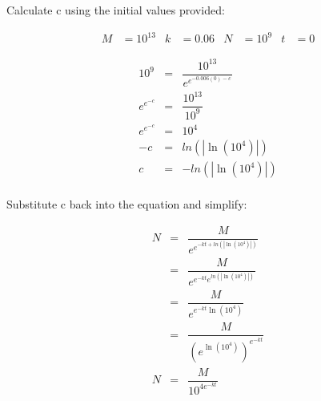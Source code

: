 \clearpage

Calculate c using the initial values provided:

\begin{align*}
    M &= 10^{13} & k &= 0.06 & N &= 10^9 & t &= 0
\end{align*}

\begin{eqnarray*}
10^9        &=& \dfrac{10^{13}}{e^{e^{-0.006(0) - c}}} \\
e^{e^{-c}}  &=& \dfrac{10^{13}}{10^9} \\
e^{e^{-c}}  &=& {10^4} \\
-c          &=& ln\left(\left|\ln\left({10^4}\right)\right|\right) \\
c           &=& -ln\left(\left|\ln\left({10^4}\right)\right|\right) \\
\end{eqnarray*}

Substitute c back into the equation and simplify:

\begin{eqnarray*}
N &=& \dfrac{M}{e^{e^{-kt + ln\left(\left|\ln\left({10^4}\right)\right|\right)}}} \\
  &=& \dfrac{M}{e^{e^{-kt} e^{ln\left(\left|\ln\left({10^4}\right)\right|\right)}}} \\
  &=& \dfrac{M}{e^{e^{-kt} \ln\left({10^4}\right)}} \\
  &=& \dfrac{M}{(e^{\ln\left({10^4}\right)})^{e^{-kt}}} \\
N  &=& \dfrac{M}{10^{4e^{-kt}}}
\end{eqnarray*}

\clearpage
